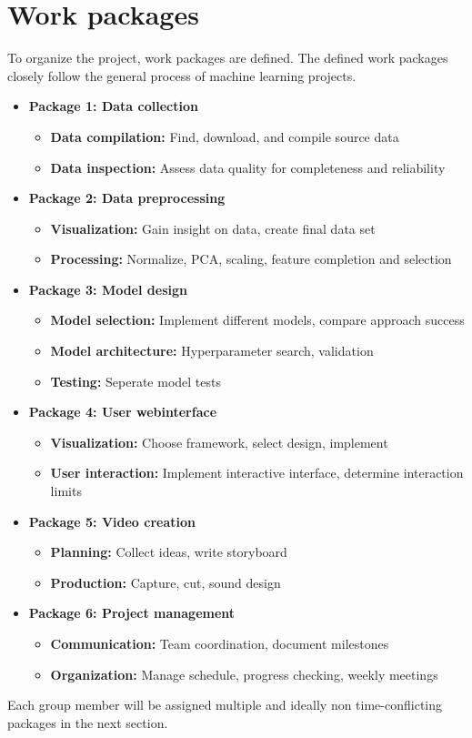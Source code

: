 \documentclass[s=english,inputenc=utf8,fontsize=10pt]{ldvarticle}
\begin{document}
\section{Work packages}
To organize the project, work packages are defined. The defined work packages closely follow the general process of machine learning projects. 
\begin{itemize}
	\item \textbf{Package 1: Data collection}
		\begin{itemize}
			\item \textbf{Data compilation:} Find, download, and compile source data
			\item \textbf{Data inspection:} Assess data quality for completeness and reliability
		\end{itemize}
	\item \textbf{Package 2: Data preprocessing}
		\begin{itemize}
			\item \textbf{Visualization:} Gain insight on data, create final data set
			\item \textbf{Processing:} Normalize, PCA, scaling, feature completion and selection
		\end{itemize}
	\item \textbf{Package 3: Model design}
		\begin{itemize}
			\item \textbf{Model selection:} Implement different models, compare approach success
			\item \textbf{Model architecture:} Hyperparameter search, validation
			\item \textbf{Testing:} Seperate model tests
		\end{itemize}
	\item \textbf{Package 4: User webinterface}
		\begin{itemize}
			\item \textbf{Visualization:} Choose framework, select design, implement
			\item \textbf{User interaction:} Implement interactive interface, determine interaction limits
		\end{itemize}
	\item \textbf{Package 5: Video creation}
		\begin{itemize}
			\item \textbf{Planning:} Collect ideas, write storyboard
			\item \textbf{Production:} Capture, cut, sound design
		\end{itemize}
	\item \textbf{Package 6: Project management}
		\begin{itemize}
			\item \textbf{Communication:} Team coordination, document milestones
			\item \textbf{Organization:} Manage schedule, progress checking, weekly meetings
		\end{itemize}
\end{itemize}
Each group member will be assigned multiple and ideally non time-conflicting packages in the next section.
\newpage
\end{document}
